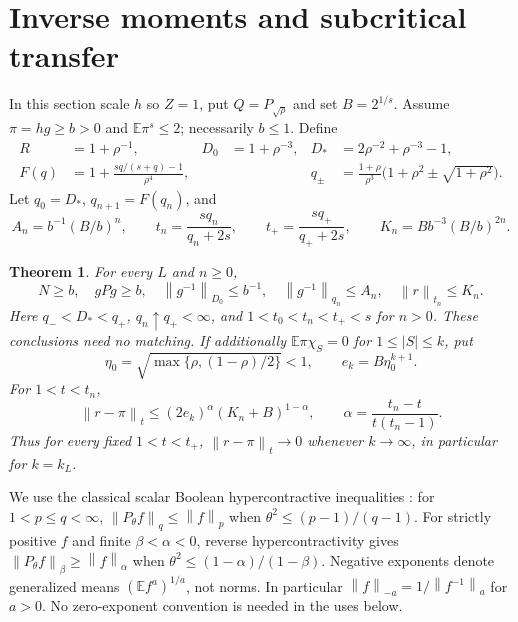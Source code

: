 \documentclass[11pt]{article}
\newcommand{\E}{\mathbb E}
\newcommand{\norm}[1]{\left\|#1\right\|}
\newtheorem{theorem}{Theorem}[section]
\begin{document}
\section{Inverse moments and subcritical transfer}
In this section scale $h$ so $Z=1$, put $Q=P_{\sqrt\rho}$ and set $B=2^{1/s}$. Assume $\pi=hg\geq b>0$ and $\E\pi^s\leq2$; necessarily $b\leq1$. Define
\begin{align*}
 R&=1+\rho^{-1},&D_0&=1+\rho^{-3},&D_*&=2\rho^{-2}+\rho^{-3}-1,\\
 F(q)&=1+\frac{sq/(s+q)-1}{\rho^4},&&&
 q_\pm&=\frac{1+\rho}{\rho^3}\bigl(1+\rho^2\pm\sqrt{1+\rho^2}\bigr).
\end{align*}
Let $q_0=D_*$, $q_{n+1}=F(q_n)$, and
\[
 A_n=b^{-1}(B/b)^n,\qquad
 t_n=\frac{sq_n}{q_n+2s},\qquad t_+=\frac{sq_+}{q_++2s},\qquad
 K_n=Bb^{-3}(B/b)^{2n}.
\]
\begin{theorem}\label{subcritical}
For every $L$ and $n\geq0$,
\[
 N\geq b,\quad gPg\geq b,\quad
 \norm{g^{-1}}_{D_0}\leq b^{-1},\quad
 \norm{g^{-1}}_{q_n}\leq A_n,\quad \norm r_{t_n}\leq K_n.
\]
Here $q_-<D_*<q_+$, $q_n\uparrow q_+<\infty$, and
$1<t_0<t_n<t_+<s$ for $n>0$. These conclusions need no matching.
If additionally $\E\pi\chi_S=0$ for $1\leq|S|\leq k$, put
\[
 \eta_0=\sqrt{\max\{\rho,(1-\rho)/2\}}<1,
 \qquad e_k=B\eta_0^{k+1}.
\]
For $1<t<t_n$,
\begin{equation}\label{strongtransfer}
 \norm{r-\pi}_t\leq (2e_k)^\alpha(K_n+B)^{1-\alpha},
 \qquad \alpha=\frac{t_n-t}{t(t_n-1)}.
\end{equation}
Thus for every fixed $1<t<t_+$, $\norm{r-\pi}_t\to0$ whenever $k\to\infty$, in particular for $k=k_L$.
\end{theorem}

We use the classical scalar Boolean hypercontractive inequalities \cite{mos}: for $1<p\leq q<\infty$, $\norm{P_\theta f}_q\leq\norm f_p$ when $\theta^2\leq(p-1)/(q-1)$. For strictly positive $f$ and finite $\beta<\alpha<0$, reverse hypercontractivity gives
$\norm{P_\theta f}_\beta\geq\norm f_\alpha$ when
$\theta^2\leq(1-\alpha)/(1-\beta)$. Negative exponents denote generalized means $(\E f^a)^{1/a}$, not norms. In particular $\norm f_{-a}=1/\norm{f^{-1}}_a$ for $a>0$. No zero-exponent convention is needed in the uses below.
\end{document}
